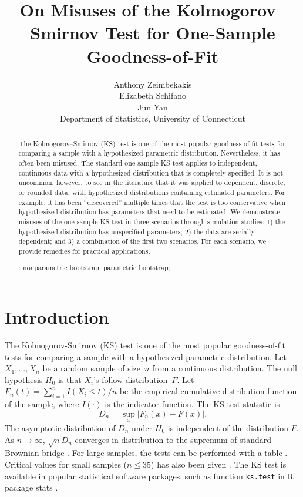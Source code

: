\documentclass[12pt, letterpaper, titlepage]{article}
\title{On Misuses of the Kolmogorov--Smirnov Test for One-Sample Goodness-of-Fit}
\author{Anthony Zeimbekakis\\
  Elizabeth Schifano\\
  Jun Yan\\[1ex]
  Department of Statistics, University of Connecticut\\
}
\date{}
\begin{document}
\maketitle

\doublespace

\begin{abstract}
The Kolmogorov--Smirnov (KS) test is one of the most popular goodness-of-fit
tests for comparing a sample with a hypothesized parametric distribution.
Nevertheless, it has often been misused. The standard one-sample KS test applies
to independent, continuous data with a hypothesized distribution that is
completely specified. It is not uncommon, however, to see in the literature that
it was applied to dependent, discrete, or rounded data, with hypothesized
distributions containing estimated parameters. For example, it has been
``discovered'' multiple times that the test is too conservative when
hypothesized distribution has parameters that need to be estimated.
We demonstrate misuses of the one-sample KS test in
three scenarios through simulation studies:
1) the hypothesized distribution has unspecified parameters;
2) the data are serially dependent; and
3) a combination of the first two scenarios.
For each scenario, we provide remedies for practical applications.

\bigskip
\noindent{}:
nonparametric bootstrap;
parametric bootstrap;
\end{abstract}

\section{Introduction}
\label{sec:intro}

The Kolmogorov-Smirnov (KS) test is one of the most popular goodness-of-fit
tests for comparing a sample with a hypothesized parametric distribution.
Let $X_1, ..., X_n$ be a random sample of size~$n$ from a continuous
distribution. The null hypothesis $H_0$ is that $X_i$'s follow distribution~$F$.
Let $F_n(t) = \sum_{i=1}^n I(X_i \le t) / n$ be the empirical cumulative
distribution function of the sample, where $I(\cdot)$ is the indicator
function. The KS test statistic is
\begin{equation}
  \label{eq:ks_standard}
  D_n = \sup_x | F_{n}(x) - F(x) |.
\end{equation}
The asymptotic distribution of $D_n$ under $H_0$ is independent of the
distribution $F$. As $n \to \infty$, $\sqrt{n} D_n$ converges in distribution to
the supremum of standard Brownian bridge \citep{kolmogorov1933sulla}. For large
samples, the tests can be performed with a table \citep{smirnov1948table}.
Critical values for small samples ($n \le 35$) has also been given
\citep{Massey}. The KS test is available in popular
statistical software packages, such as function \texttt{ks.test} in R package
\textsf{stats} \citep{R, Marsaglia}.
\end{document}
